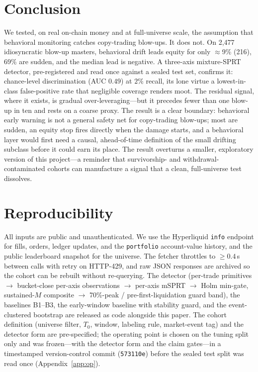 \documentclass[11pt,a4paper]{article}
\newcommand{\Tnull}{T_{0}}
\begin{document}
\section{Conclusion}
\label{sec:conclusion}

We tested, on real on-chain money and at full-universe scale, the assumption that
behavioral monitoring catches copy-trading blow-ups. It does not. On 2{,}477
idiosyncratic blow-up masters, behavioral drift leads equity for only $\approx$9\%
(216), 69\% are sudden, and the median lead is negative. A three-axis mixture-SPRT
detector, pre-registered and read once against a sealed test set, confirms it:
chance-level discrimination (AUC $0.49$) at $2\%$ recall, its lone virtue a
lowest-in-class false-positive rate that negligible coverage renders moot. The
residual signal, where it exists, is gradual over-leveraging---but it precedes fewer
than one blow-up in ten and rests on a coarse proxy. The result is a clear boundary:
behavioral early warning is not a general safety net for
copy-trading blow-ups; most are sudden, an equity stop fires directly when the damage
starts, and a behavioral layer would first need a causal, ahead-of-time definition of
the small drifting
subclass before it could earn its place. The result overturns a smaller, exploratory
version of this project---a reminder that survivorship- and withdrawal-contaminated
cohorts can manufacture a signal that a clean, full-universe test dissolves.

\appendix
\section{Reproducibility}
\label{app:repro}

All inputs are public and unauthenticated. We use the Hyperliquid \texttt{info}
endpoint \citep{hyperliquid2024docs} for fills, orders, ledger updates, and the
\texttt{portfolio} account-value history, and the public leaderboard snapshot for
the universe. The fetcher throttles to $\geq 0.4$\,s between calls with retry on
HTTP-429, and raw JSON responses are archived so the cohort can be rebuilt without
re-querying. The detector (per-trade primitives $\to$ bucket-close per-axis
observations $\to$ per-axis mSPRT $\to$ Holm min-gate, sustained-$M$ composite $\to$
70\%-peak / pre-first-liquidation guard band), the baselines B1--B3, the early-window
baseline with stability guard, and the event-clustered bootstrap are released as
code alongside this paper. The cohort definition (universe filter, $\Tnull$, window,
labeling rule, market-event tag) and the detector form are pre-specified; the
operating point is chosen on the tuning split only and was frozen---with the
detector form and the claim gates---in a timestamped version-control commit
(\texttt{573110e}) before the sealed test split was read once (Appendix~\ref{app:op}).
\end{document}
